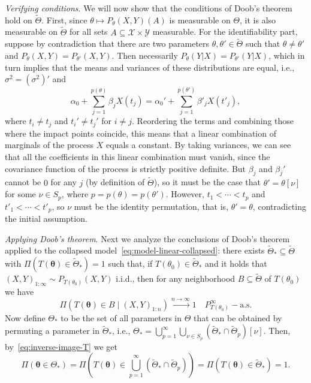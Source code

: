 \documentclass{article}
\numberwithin{equation}{section}
\theoremstyle{plain}
\theoremstyle{definition}
\newcommand{\tTheta}{\tilde{\Theta}}
\begin{document}
\textit{Verifying conditions}. We will now show that the conditions of Doob's theorem hold on \(\tTheta\). First, since \(\theta \mapsto P_\theta(X, Y)(A)\) is measurable on \(\Theta\), it is also measurable on \(\tTheta\) for all sets \(A\subseteq \mathcal X \times \mathcal Y\) measurable. For the identifiability part, suppose by contradiction that there are two parameters \(\theta,\theta' \in \tTheta\) such that \(\theta\neq \theta'\) and \(P_{\theta}(X, Y) = P_{\theta'}(X, Y)\). Then necessarily \(P_{\theta}(Y|X) = P_{\theta'}(Y|X)\), which in turn implies that the means and variances of these distributions are equal, i.e., \(\sigma^2=(\sigma^2)'\) and
\[
\alpha_0 + \sum_{j=1}^{p(\theta)} \beta_j X(t_j) = \alpha_0' + \sum_{j=1}^{p(\theta')} \beta'_j X(t'_j),
\] 
where \(t_i\neq t_j\) and \(t_i'\neq t_j'\) for \(i\neq j\). Reordering the terms and combining those where the impact points coincide, this means that a linear combination of marginals of the process \(X\) equals a constant. By taking variances, we can see that all the coefficients in this linear combination must vanish, since the covariance function of the process is strictly positive definite. But \(\beta_j\) and \(\beta_j'\) cannot be \(0\) for any \(j\) (by definition of \(\tTheta\)), so it must be the case that \(\theta'=\theta[\nu]\) for some \(\nu \in S_p\), where \(p=p(\theta)=p(\theta')\). However, \(t_1< \cdots < t_p\) and \(t'_1 < \cdots < t'_p\), so  \(\nu\) must be the identity permutation, that is, \(\theta'=\theta\), contradicting the initial assumption.

\textit{Applying Doob's theorem}. Next we analyze the conclusions of Doob's theorem applied to the collapsed model~\eqref{eq:model-linear-collapsed}: there exists \(\tTheta_* \subseteq \tTheta\) with \(\Pi(T(\bm\theta)\in\tTheta_*)=1\) such that, if \(T(\theta_0)\in \tTheta_*\) and it holds that \((X,Y)_{1:\infty} \sim P_{T(\theta_0)}(X, Y)\) i.i.d., then for any neighborhood \(B\subseteq \tTheta\) of \(T(\theta_0)\) we have
\begin{equation}\label{eq:consistency-collapsed}
  \Pi(T(\bm\theta) \in B \mid (X,Y)_{1:n}) \xrightarrow[]{n\to\infty} 1 \quad P_{T(\theta_0)}^\infty-\text{a.s.}
\end{equation}
Now define \(\Theta_*\) to be the set of all parameters in \(\Theta\) that can be obtained by permuting a parameter in \(\tTheta_*\), i.e., \(\Theta_* = \bigcup_{p=1}^\infty \bigcup_{\nu\in S_p}(\tTheta_* \cap \tTheta_p)[\nu]\). Then, by~\eqref{eq:inverse-image-T} we get \[
  \Pi(\bm\theta\in \Theta_*) = \Pi\left(T(\bm\theta) \in \bigcup_{p=1}^\infty (\tTheta_*\cap \tTheta_p)\right) = \Pi(T(\bm\theta)\in \tTheta_*) = 1.\]
\end{document}

